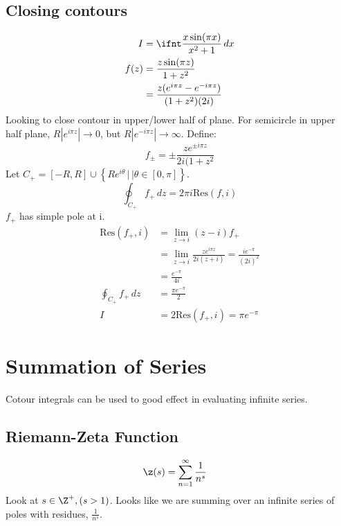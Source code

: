 \documentclass[a4paper, 11pt, normalem]{report}
\begin{document}
\section{Closing contours}
\begin{example}
    \begin{align}
        I &= \ifnt \frac{x\sin(\pi x)}{x^2 + 1}\,dx \\
        f(z) &= \frac{z\sin(\pi z)}{1+z^2} \\
             &= \frac{z(e^{i\pi z} - e^{-i\pi z})}{(1+z^2)(2i)}
    \end{align}
    Looking to close contour in upper/lower half of plane.
    For semicircle in upper half plane, $R|e^{i\pi z}| \to 0$, but $R|e^{-i\pi z}| \to \infty$.
    Define:
    \begin{equation}
        f_{\pm} = \pm\frac{ze^{\pm i\pi z}}{2i(1+z^2}
    \end{equation}
    Let $C_+ = [-R,R] \cup \left\{ Re^{i\theta}\,|\,| \theta \in [0,\pi]\right\}$.
    \begin{equation}
        \oint_{C_+} f_+\,dz = 2\pi i\text{Res}(f,i)
    \end{equation}
    $f_+$ has simple pole at i. 
    \begin{align}
        \text{Res}(f_+,i) &= \lim_{z\to i} (z-i)f_+ \\
                          &= \lim_{z\to i} \frac{ze^{i\pi z}}{2i(z+i)} = \frac{ie^{-\pi}}{(2i)^2} \\
                          &= \frac{e^{-\pi}}{4i} \\
        \oint_{C_+} f_+\,dz &= \frac{\pi e^{-\pi}}{2} \\
        I &= 2\text{Res}(f_+,i) = \pi e^{-\pi}
    \end{align}
\end{example}

\chapter{Summation of Series}
Cotour integrals can be used to good effect in evaluating infinite series. 

\section{Riemann-Zeta Function}
\begin{align}
    \z(s) &= \sum_{n=1}^\infty \frac{1}{n^s}
\end{align}
Look at $s \in \Z^+, (s > 1)$.
Looks like we are summing over an infinite series of poles with residues, $\frac{1}{n^s}$.
\end{document}
